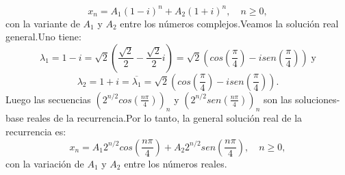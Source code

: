 $$
x_{n}=A_{1}(1-i)^{n}+A_{2}(1+i)^{n}, \quad n \geq 0,
$$
con la variante de $ A_{1} $ y $ A_{2} $ entre los números complejos.Veamos la solución real general.Uno tiene:
$$
\lambda_{1}=1-i=\sqrt{2}\left(\frac{\sqrt{2}}{2}-\frac{\sqrt{2}}{2}i \right)=\sqrt{2}\left(cos\left( \frac{\pi}{4}\right )-isen\left(\frac{\pi}{4} \right)        \right) \; \text{y}
$$
$$
\lambda_{2}=1+i=\overline{\lambda_{1}}=\sqrt{2}\left(cos\left(\frac{\pi}{4}\right)-isen\left (\frac{\pi}{4}\right )   \right).
$$
Luego las secuencias $\displaystyle \left(2^{n/2}cos\left( \frac{n\pi}{4}\right)\right)_{n} $ y $\displaystyle \left(2^{n/2}sen\left( \frac{n\pi}{4}\right)\right)_{n}  $ son las soluciones-base reales de la recurrencia.Por lo tanto, la general solución real de la recurrencia es:
$$
x_{n}=A_{1}2^{n/2}cos\left(\frac{n\pi}{4}\right )+A_{2}2^{n/2}sen\left( \frac{n\pi}{4} \right ),\quad n\geq 0,
$$
con la variación de $ A_{1} $ y $ A_{2} $ entre los números reales.